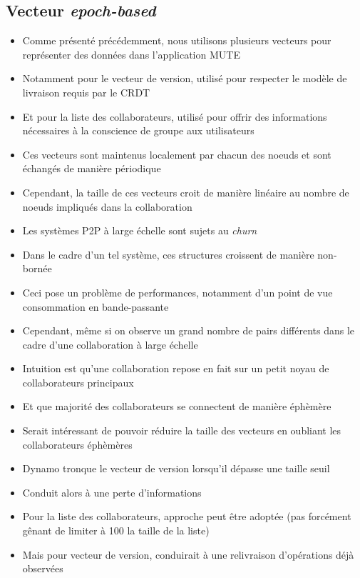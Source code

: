 \documentclass[12pt]{thesul}
\begin{document}
\subsection{Vecteur \emph{epoch-based}}

\begin{itemize}
  \item Comme présenté précédemment, nous utilisons plusieurs vecteurs pour représenter des données dans l'application MUTE
  \item Notamment pour le vecteur de version, utilisé pour respecter le modèle de livraison requis par le \ac{CRDT}
  \item Et pour la liste des collaborateurs, utilisé pour offrir des informations nécessaires à la conscience de groupe aux utilisateurs
  \item Ces vecteurs sont maintenus localement par chacun des noeuds et sont échangés de manière périodique
  \item Cependant, la taille de ces vecteurs croit de manière linéaire au nombre de noeuds impliqués dans la collaboration
  \item Les systèmes \ac{P2P} à large échelle sont sujets au \emph{churn}
  \item Dans le cadre d'un tel système, ces structures croissent de manière non-bornée
  \item Ceci pose un problème de performances, notamment d'un point de vue consommation en bande-passante
  \item Cependant, même si on observe un grand nombre de pairs différents dans le cadre d'une collaboration à large échelle
  \item Intuition est qu'une collaboration repose en fait sur un petit noyau de collaborateurs principaux
  \item Et que majorité des collaborateurs se connectent de manière éphèmère
  \item Serait intéressant de pouvoir réduire la taille des vecteurs en oubliant les collaborateurs éphèmères
  \item Dynamo\cite{2007-dynamo} tronque le vecteur de version lorsqu'il dépasse une taille seuil
  \item Conduit alors à une perte d'informations
  \item Pour la liste des collaborateurs, approche peut être adoptée (pas forcément gênant de limiter à 100 la taille de la liste)
  \item Mais pour vecteur de version, conduirait à une relivraison d'opérations déjà observées

\end{itemize}
\end{document}

